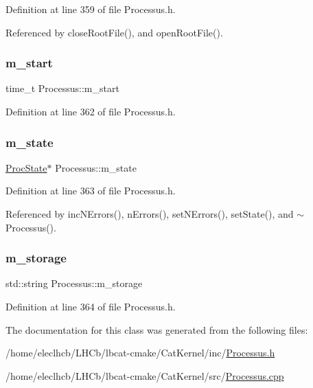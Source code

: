 Definition at line 359 of file Processus.\+h.



Referenced by close\+Root\+File(), and open\+Root\+File().

\mbox{\label{classProcessus_a8ec00b2e12c5beada932610f30218e93}} 
\subsubsection{\texorpdfstring{m\+\_\+start}{m\_start}}
{\footnotesize\ttfamily time\+\_\+t Processus\+::m\+\_\+start\hspace{0.3cm}{\ttfamily [private]}}



Definition at line 362 of file Processus.\+h.

\mbox{\label{classProcessus_ab3539eee42891ceae0baf4395ae7fb61}} 
\subsubsection{\texorpdfstring{m\+\_\+state}{m\_state}}
{\footnotesize\ttfamily \hyperlink{structProcState}{Proc\+State}$\ast$ Processus\+::m\+\_\+state\hspace{0.3cm}{\ttfamily [private]}}



Definition at line 363 of file Processus.\+h.



Referenced by inc\+N\+Errors(), n\+Errors(), set\+N\+Errors(), set\+State(), and $\sim$\+Processus().

\mbox{\label{classProcessus_a132b1e71f72327e5a87f0a168c7b6325}} 
\subsubsection{\texorpdfstring{m\+\_\+storage}{m\_storage}}
{\footnotesize\ttfamily std\+::string Processus\+::m\+\_\+storage\hspace{0.3cm}{\ttfamily [private]}}



Definition at line 364 of file Processus.\+h.



The documentation for this class was generated from the following files\+:\begin{DoxyCompactItemize}
\item 
/home/eleclhcb/\+L\+H\+Cb/lbcat-\/cmake/\+Cat\+Kernel/inc/\hyperlink{Processus_8h}{Processus.\+h}\item 
/home/eleclhcb/\+L\+H\+Cb/lbcat-\/cmake/\+Cat\+Kernel/src/\hyperlink{Processus_8cpp}{Processus.\+cpp}\end{DoxyCompactItemize}
